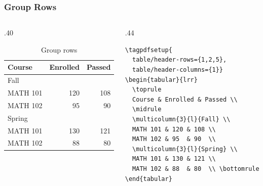 \documentclass{ltx-talk}
\begin{document}
\begin{frame*}
  \frametitle{Group Rows}
  \begin{columns}
    \begin{column}{.40\textwidth}
      \begin{table}
        \caption{Group rows}\label{tab:grouprows}
        \begin{tabular}{lrr}
          \toprule Course & Enrolled & Passed \\ \midrule
          \multicolumn{3}{l}{Fall} \\
          MATH 101 & 120 & 108 \\
          MATH 102 & 95  & 90  \\
          \multicolumn{3}{l}{Spring} \\
          MATH 101 & 130 & 121 \\
          MATH 102 & 88  & 80  \\ \bottomrule
        \end{tabular}
      \end{table}
    \end{column}
    \begin{column}{.44\textwidth}
\small
\begin{verbatim}
\tagpdfsetup{
  table/header-rows={1,2,5},
  table/header-columns={1}}
\begin{tabular}{lrr}
  \toprule
  Course & Enrolled & Passed \\
  \midrule
  \multicolumn{3}{l}{Fall} \\
  MATH 101 & 120 & 108 \\
  MATH 102 & 95  & 90  \\
  \multicolumn{3}{l}{Spring} \\
  MATH 101 & 130 & 121 \\
  MATH 102 & 88  & 80  \\ \bottomrule
\end{tabular}
\end{verbatim}
    \end{column}
  \end{columns}
\end{frame*}
\end{document}
